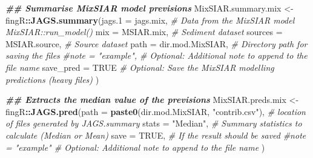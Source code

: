 \documentclass[
]{article}
\newenvironment{Shaded}{\begin{snugshade}}{\end{snugshade}}
\newcommand{\AttributeTok}[1]{\textcolor[rgb]{0.13,0.29,0.53}{#1}}
\newcommand{\CommentTok}[1]{\textcolor[rgb]{0.56,0.35,0.01}{\textit{#1}}}
\newcommand{\ConstantTok}[1]{\textcolor[rgb]{0.56,0.35,0.01}{#1}}
\newcommand{\DocumentationTok}[1]{\textcolor[rgb]{0.56,0.35,0.01}{\textbf{\textit{#1}}}}
\newcommand{\FunctionTok}[1]{\textcolor[rgb]{0.13,0.29,0.53}{\textbf{#1}}}
\newcommand{\NormalTok}[1]{#1}
\newcommand{\OtherTok}[1]{\textcolor[rgb]{0.56,0.35,0.01}{#1}}
\newcommand{\SpecialCharTok}[1]{\textcolor[rgb]{0.81,0.36,0.00}{\textbf{#1}}}
\newcommand{\StringTok}[1]{\textcolor[rgb]{0.31,0.60,0.02}{#1}}
\begin{document}
\begin{Shaded}
\begin{Highlighting}[]
\DocumentationTok{\#\# Summarise MixSIAR model previsions}
\NormalTok{MixSIAR.summary.mix }\OtherTok{\textless{}{-}}\NormalTok{ fingR}\SpecialCharTok{::}\FunctionTok{JAGS.summary}\NormalTok{(}\AttributeTok{jags.1 =}\NormalTok{ jags.mix,                        }\CommentTok{\# Data from the MixSIAR model \textasciigrave{}MixSIAR::run\_model()\textasciigrave{}}
                                          \AttributeTok{mix =}\NormalTok{ MSIAR.mix,                           }\CommentTok{\# Sediment dataset }
                                          \AttributeTok{sources =}\NormalTok{ MSIAR.source,                    }\CommentTok{\# Source dataset}
                                          \AttributeTok{path =}\NormalTok{ dir.mod.MixSIAR,                    }\CommentTok{\# Directory path for saving the files}
                                          \CommentTok{\#note = "example",                         \# Optional: Additional note to append to the file name}
                                          \AttributeTok{save\_pred =} \ConstantTok{TRUE}                           \CommentTok{\# Optional: Save the MixSIAR modelling predictions (heavy files)}
\NormalTok{                                          )}

\DocumentationTok{\#\# Extracts the median value of the previsions}
\NormalTok{MixSIAR.preds.mix }\OtherTok{\textless{}{-}}\NormalTok{ fingR}\SpecialCharTok{::}\FunctionTok{JAGS.pred}\NormalTok{(}\AttributeTok{path =} \FunctionTok{paste0}\NormalTok{(dir.mod.MixSIAR, }\StringTok{"contrib.csv"}\NormalTok{), }\CommentTok{\# location of files generated by \textasciigrave{}JAGS.summary\textasciigrave{}}
                                     \AttributeTok{stats =} \StringTok{"Median"}\NormalTok{,                               }\CommentTok{\# Summary statistics to calculate (Median or Mean)}
                                     \AttributeTok{save =} \ConstantTok{TRUE}\NormalTok{,                                    }\CommentTok{\# If the result should be saved}
                                     \CommentTok{\#note = "example"                               \# Optional: Additional note to append to the file name }
\NormalTok{                                     )}


\end{Highlighting}
\end{Shaded}
\end{document}

